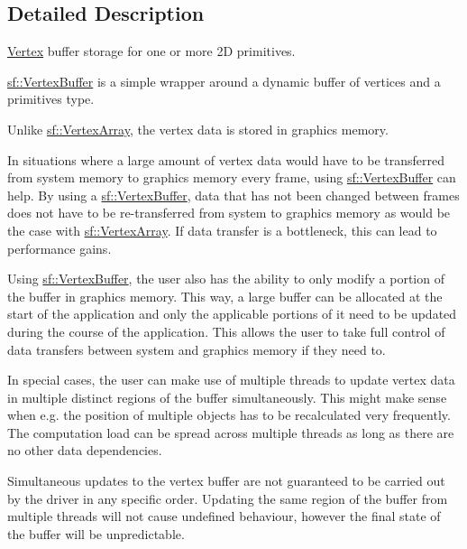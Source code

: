 \subsection{Detailed Description}
\mbox{\hyperlink{classsf_1_1_vertex}{Vertex}} buffer storage for one or more 2D primitives. 

\begin{DoxyVerb}\end{DoxyVerb}


\mbox{\hyperlink{classsf_1_1_vertex_buffer}{sf\+::\+Vertex\+Buffer}} is a simple wrapper around a dynamic buffer of vertices and a primitives type.

Unlike \mbox{\hyperlink{classsf_1_1_vertex_array}{sf\+::\+Vertex\+Array}}, the vertex data is stored in graphics memory.

In situations where a large amount of vertex data would have to be transferred from system memory to graphics memory every frame, using \mbox{\hyperlink{classsf_1_1_vertex_buffer}{sf\+::\+Vertex\+Buffer}} can help. By using a \mbox{\hyperlink{classsf_1_1_vertex_buffer}{sf\+::\+Vertex\+Buffer}}, data that has not been changed between frames does not have to be re-\/transferred from system to graphics memory as would be the case with \mbox{\hyperlink{classsf_1_1_vertex_array}{sf\+::\+Vertex\+Array}}. If data transfer is a bottleneck, this can lead to performance gains.

Using \mbox{\hyperlink{classsf_1_1_vertex_buffer}{sf\+::\+Vertex\+Buffer}}, the user also has the ability to only modify a portion of the buffer in graphics memory. This way, a large buffer can be allocated at the start of the application and only the applicable portions of it need to be updated during the course of the application. This allows the user to take full control of data transfers between system and graphics memory if they need to.

In special cases, the user can make use of multiple threads to update vertex data in multiple distinct regions of the buffer simultaneously. This might make sense when e.\+g. the position of multiple objects has to be recalculated very frequently. The computation load can be spread across multiple threads as long as there are no other data dependencies.

Simultaneous updates to the vertex buffer are not guaranteed to be carried out by the driver in any specific order. Updating the same region of the buffer from multiple threads will not cause undefined behaviour, however the final state of the buffer will be unpredictable.


